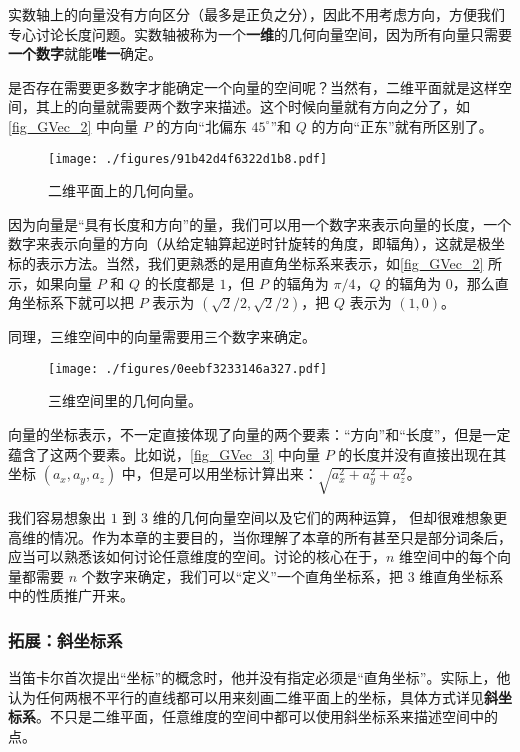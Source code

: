实数轴上的向量没有方向区分（最多是正负之分），因此不用考虑方向，方便我们专心讨论长度问题。实数轴被称为一个\textbf{一维}的几何向量空间，因为所有向量只需要\textbf{一个数字}就能\textbf{唯一}确定。

是否存在需要更多数字才能确定一个向量的空间呢？当然有，二维平面就是这样空间，其上的向量就需要两个数字来描述。这个时候向量就有方向之分了，如\autoref{fig_GVec_2} 中向量 $P$ 的方向“北偏东 $45^\circ$”和 $Q$ 的方向“正东”就有所区别了。

\begin{figure}[ht]
\centering
\texttt{[image: ./figures/91b42d4f6322d1b8.pdf]}
\caption{二维平面上的几何向量。} \label{fig_GVec_2}
\end{figure}

因为向量是“具有长度和方向”的量，我们可以用一个数字来表示向量的长度，一个数字来表示向量的方向（从给定轴算起逆时针旋转的角度，即辐角），这就是极坐标的表示方法。当然，我们更熟悉的是用直角坐标系来表示，如\autoref{fig_GVec_2} 所示，如果向量 $P$ 和 $Q$ 的长度都是 $1$，但 $P$ 的辐角为 $\pi/4$，$Q$ 的辐角为 $0$，那么直角坐标系下就可以把 $P$ 表示为 $(\sqrt{2}/2, \sqrt{2}/2)$，把 $Q$ 表示为 $(1, 0)$。

同理，三维空间中的向量需要用三个数字来确定。

\begin{figure}[ht]
\centering
\texttt{[image: ./figures/0eebf3233146a327.pdf]}
\caption{三维空间里的几何向量。} \label{fig_GVec_3}
\end{figure}

向量的坐标表示，不一定直接体现了向量的两个要素：“方向”和“长度”，但是一定蕴含了这两个要素。比如说，\autoref{fig_GVec_3} 中向量 $P$ 的长度并没有直接出现在其坐标 $(a_x, a_y, a_z)$ 中，但是可以用坐标计算出来：$\sqrt{a_x^2+a_y^2+a_z^2}$。

我们容易想象出 $1$ 到 $3$ 维的几何向量空间以及它们的两种运算， 但却很难想象更高维的情况。作为本章的主要目的，当你理解了本章的所有甚至只是部分词条后，应当可以熟悉该如何讨论任意维度的空间。讨论的核心在于，$n$ 维空间中的每个向量都需要 $n$ 个数字来确定，我们可以“定义”一个直角坐标系，把 $3$ 维直角坐标系中的性质推广开来。

\subsubsection{拓展：斜坐标系}

当笛卡尔首次提出“坐标”的概念时，他并没有指定必须是“直角坐标”。实际上，他认为任何两根不平行的直线都可以用来刻画二维平面上的坐标，具体方式详见\textbf{斜坐标系}。不只是二维平面，任意维度的空间中都可以使用斜坐标系来描述空间中的点。

